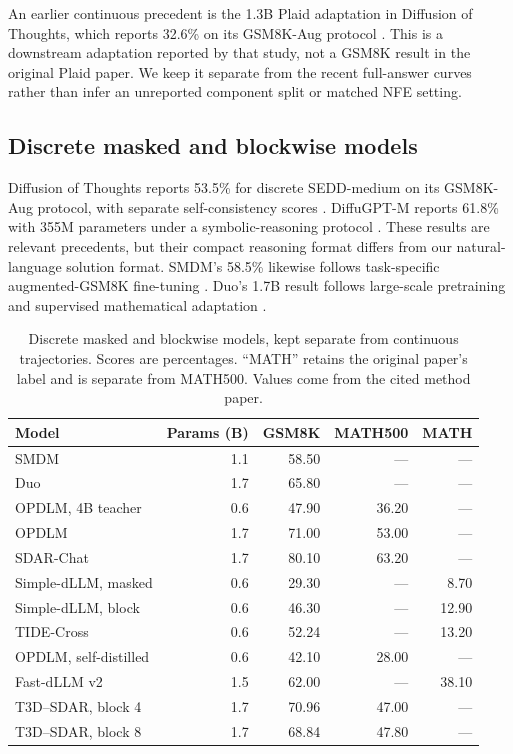 An earlier continuous precedent is the 1.3B Plaid adaptation in Diffusion of Thoughts, which reports 32.6\% on its GSM8K-Aug protocol \citep{dot}. This is a downstream adaptation reported by that study, not a GSM8K result in the original Plaid paper. We keep it separate from the recent full-answer curves rather than infer an unreported component split or matched NFE setting.

\subsection{Discrete masked and blockwise models}
\label{app:literaturediscrete}
Diffusion of Thoughts reports 53.5\% for discrete SEDD-medium on its GSM8K-Aug protocol, with separate self-consistency scores \citep{dot}. DiffuGPT-M reports 61.8\% with 355M parameters under a symbolic-reasoning protocol \citep{diffugpt}. These results are relevant precedents, but their compact reasoning format differs from our natural-language solution format. SMDM's 58.5\% likewise follows task-specific augmented-GSM8K fine-tuning \citep{smdm}. Duo's 1.7B result follows large-scale pretraining and supervised mathematical adaptation \citep{duoscaling}.

\begin{table}[ht]
\caption{Discrete masked and blockwise models, kept separate from continuous trajectories. Scores are percentages. ``MATH'' retains the original paper's label and is separate from MATH500. Values come from the cited method paper.}
\label{tab:literaturesmall}
\centering\small
\begin{tabular}{lrrrr}
\toprule
Model & Params (B) & GSM8K & MATH500 & MATH\\
\midrule
SMDM \citep{smdm} & 1.1 & 58.50 & --- & ---\\
Duo \citep{duoscaling} & 1.7 & 65.80 & --- & ---\\
OPDLM, 4B teacher \citep{opdlm} & 0.6 & 47.90 & 36.20 & ---\\
OPDLM \citep{opdlm} & 1.7 & 71.00 & 53.00 & ---\\
SDAR-Chat \citep{sdar} & 1.7 & 80.10 & 63.20 & ---\\
Simple-dLLM, masked \citep{simpledllm} & 0.6 & 29.30 & --- & 8.70\\
Simple-dLLM, block \citep{simpledllm} & 0.6 & 46.30 & --- & 12.90\\
TIDE-Cross \citep{tide} & 0.6 & 52.24 & --- & 13.20\\
OPDLM, self-distilled \citep{opdlm} & 0.6 & 42.10 & 28.00 & ---\\
Fast-dLLM v2 \citep{fastv2} & 1.5 & 62.00 & --- & 38.10\\
T3D--SDAR, block 4 \citep{t3d} & 1.7 & 70.96 & 47.00 & ---\\
T3D--SDAR, block 8 \citep{t3d} & 1.7 & 68.84 & 47.80 & ---\\
\bottomrule
\end{tabular}
\end{table}

